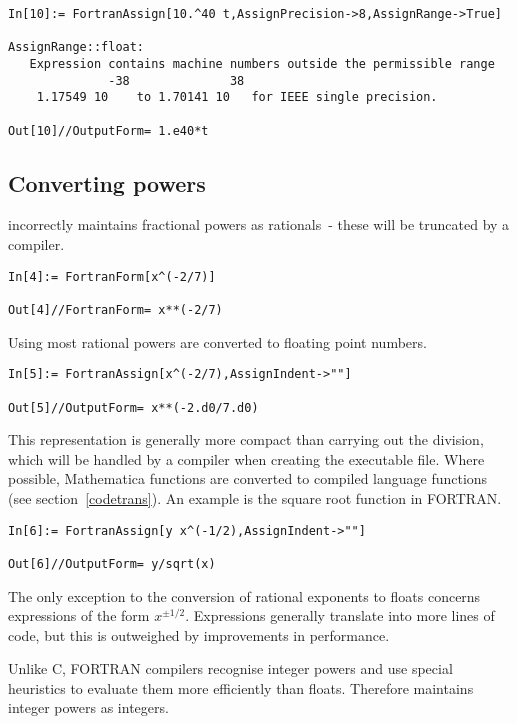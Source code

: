 \documentclass [12pt,twoside]{article}
\begin{document}
\begin{verbatim}
In[10]:= FortranAssign[10.^40 t,AssignPrecision->8,AssignRange->True]

AssignRange::float: 
   Expression contains machine numbers outside the permissible range 
              -38              38
    1.17549 10    to 1.70141 10   for IEEE single precision.

Out[10]//OutputForm= 1.e40*t
\end{verbatim}

\pagebreak[2]

\subsection{Converting powers}

 incorrectly maintains fractional powers as
rationals~- these will be truncated by a compiler.

\begin{verbatim}
In[4]:= FortranForm[x^(-2/7)]

Out[4]//FortranForm= x**(-2/7)
\end{verbatim}
Using  most rational powers are converted to floating
point numbers.

\begin{verbatim}
In[5]:= FortranAssign[x^(-2/7),AssignIndent->""]

Out[5]//OutputForm= x**(-2.d0/7.d0)
\end{verbatim}
This representation is generally more compact than carrying out the division,
which will be handled by a compiler when creating the executable file.
Where possible, Mathematica functions are converted to compiled language
functions (see section~\ref{codetrans}). An example is the square root
function in FORTRAN.

\begin{verbatim}
In[6]:= FortranAssign[y x^(-1/2),AssignIndent->""]

Out[6]//OutputForm= y/sqrt(x)
\end{verbatim}
The only exception to the conversion of rational exponents to floats
concerns expressions of the form $x^{\pm 1/2}$. Expressions generally translate
into more lines of code, but this is outweighed by improvements in performance.

Unlike C, FORTRAN compilers recognise integer powers and use special
heuristics to evaluate them more efficiently than floats. Therefore
 maintains integer powers as integers.
\end{document}
